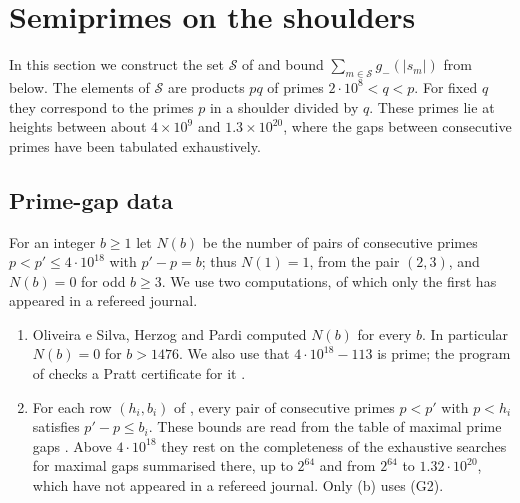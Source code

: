 \documentclass[11pt,colorlinks]{charlie}
\newcommand{\cS}{\mathcal S}
\begin{document}
\section{Semiprimes on the shoulders}\label{sec:semiprimes}
In this section we construct the set $\cS$ of  and bound $\sum_{m\in\cS}g_-(|s_m|)$ from below. The elements of $\cS$ are products $pq$ of primes $2\cdot10^8<q<p$. For fixed $q$ they correspond to the primes $p$ in a shoulder divided by $q$. These primes lie at heights between about $4\times10^9$ and $1.3\times10^{20}$, where the gaps between consecutive primes have been tabulated exhaustively.

\subsection{Prime-gap data}
For an integer $b\ge1$ let $N(b)$ be the number of pairs of consecutive primes $p<p'\le4\cdot10^{18}$ with $p'-p=b$; thus $N(1)=1$, from the pair $(2,3)$, and $N(b)=0$ for odd $b\ge3$. We use two computations, of which only the first has appeared in a refereed journal.
\begin{enumerate}
\item[(G1)] Oliveira e Silva, Herzog and Pardi \cite{OeSHP} computed $N(b)$ for every $b$. In particular $N(b)=0$ for $b>1476$. We also use that $4\cdot10^{18}-113$ is prime; the program of  checks a Pratt certificate for it \cite{Pratt}.
\item[(G2)] For each row $(h_i,b_i)$ of , every pair of consecutive primes $p<p'$ with $p<h_i$ satisfies $p'-p\le b_i$. These bounds are read from the table of maximal prime gaps \cite{RecordGaps}. Above $4\cdot10^{18}$ they rest on the completeness of the exhaustive searches for maximal gaps summarised there, up to $2^{64}$ and from $2^{64}$ to $1.32\cdot10^{20}$, which have not appeared in a refereed journal. Only (b) uses (G2).
\end{enumerate}
\end{document}

